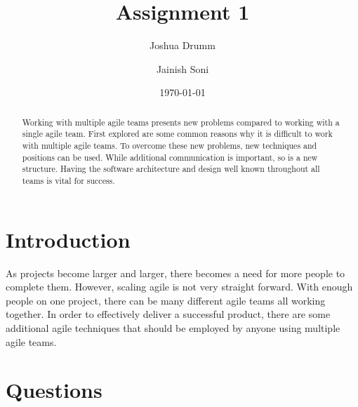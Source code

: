 \documentclass[sigplan,screen]{acmart}
\begin{document}
\title{Assignment 1}

\author{Joshua Drumm}

\author{Jainish Soni}

\date{\today}

\begin{abstract}
Working with multiple agile teams presents new problems compared to working with a single agile team. First explored are some common reasons why it is difficult to work with multiple agile teams. To overcome these new problems, new techniques and positions can be used. While additional communication is important, so is a new structure. Having the software architecture and design well known throughout all teams is vital for success.
\end{abstract}


\maketitle

\newpage
{}



\section{Introduction}
As projects become larger and larger, there becomes a need for more people to complete them. However, scaling agile is not very straight forward. With enough people on one project, there can be many different agile teams all working together. In order to effectively deliver a successful product, there are some additional agile techniques that should be employed by anyone using multiple agile teams.

\section{Questions}
\end{document}
